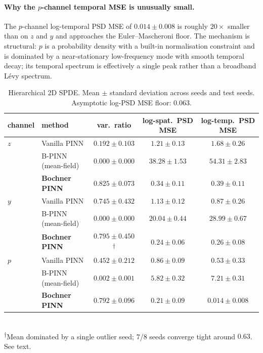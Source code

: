 \documentclass[review,12pt]{elsarticle}
\begin{document}
\paragraph{Why the $p$-channel temporal MSE is unusually small.}
The $p$-channel log-temporal PSD MSE of \(0.014 \pm 0.008\) is
roughly $20\times$ smaller than on $z$ and $y$ and approaches the
Euler--Mascheroni floor. The mechanism is structural: $p$ is a
probability density with a built-in normalisation constraint and
is dominated by a near-stationary low-frequency mode with smooth
temporal decay; its temporal spectrum is effectively a single peak
rather than a broadband L\'evy spectrum.

\begin{table}[h]
\centering
\caption{Hierarchical 2D SPDE. Mean \(\pm\) standard deviation
across seeds and test seeds. Asymptotic log-PSD MSE floor: 0.063.}
\label{tab:hier}
\begin{tabular}{l l c c c}
\toprule
channel & method & var.\ ratio & log-spat.\ PSD MSE & log-temp.\ PSD MSE \\
\midrule
\(z\) & Vanilla PINN     & \(0.192 \pm 0.103\) & \(1.21 \pm 0.13\) & \(1.68 \pm 0.26\) \\
   & B-PINN (mean-field)  & \(0.000 \pm 0.000\) & \(38.28 \pm 1.53\) & \(54.31 \pm 2.83\) \\
   & \textbf{Bochner PINN} & \(\mathbf{0.825 \pm 0.073}\) & \(\mathbf{0.34 \pm 0.11}\) & \(\mathbf{0.39 \pm 0.11}\) \\
\midrule
\(y\) & Vanilla PINN     & \(0.745 \pm 0.432\) & \(1.13 \pm 0.12\) & \(0.87 \pm 0.26\) \\
   & B-PINN (mean-field)  & \(0.000 \pm 0.000\) & \(20.04 \pm 0.44\) & \(28.99 \pm 0.67\) \\
   & \textbf{Bochner PINN} & \(0.795 \pm 0.450\)\textsuperscript{$\dagger$}
                & \(\mathbf{0.24 \pm 0.06}\)
                & \(\mathbf{0.26 \pm 0.08}\) \\
\midrule
\(p\) & Vanilla PINN     & \(0.452 \pm 0.212\) & \(0.86 \pm 0.09\) & \(0.53 \pm 0.33\) \\
   & B-PINN (mean-field)  & \(0.002 \pm 0.001\) & \(5.82 \pm 0.32\) & \(7.21 \pm 0.31\) \\
   & \textbf{Bochner PINN} & \(\mathbf{0.792 \pm 0.096}\)
                & \(\mathbf{0.21 \pm 0.09}\)
                & \(\mathbf{0.014 \pm 0.008}\) \\
\bottomrule
\end{tabular}\\[4pt]
\textsuperscript{$\dagger$}Mean dominated by a single outlier
seed; 7/8 seeds converge tight around $0.63$. See text.
\end{table}
\end{document}
